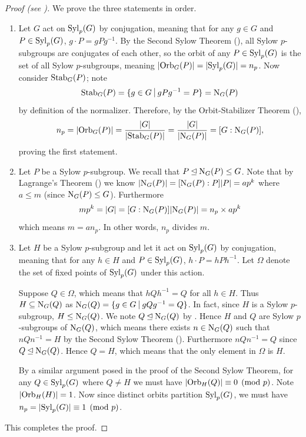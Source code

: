 \begin{proof}[Proof (see \cite{wielandt_1959})]
    We prove the three statements in order.
    \begin{enumerate}
        \item Let $G$ act on $\mathrm{Syl}_{p}(G)$ by conjugation, meaning that for any $g \in G$ and $P \in \mathrm{Syl}_{p}(G)$, $g\cdot P = gPg^{-1}$. By the Second Sylow Theorem (), all Sylow $p$-subgroups are conjugates of each other, so the orbit of any $P \in \mathrm{Syl}_{p}(G)$ is the set of all Sylow $p$-subgroups, meaning $|\mathrm{Orb}_{G}(P)| = |\mathrm{Syl}_{p}(G)| = n_p$. Now consider $\mathrm{Stab}_{G}(P)$; note
        \[
            \Stab{G}{P} = \{g \in G \vert gPg^{-1} = P\} = \N{G}{P}
        \]
        by definition of the normalizer. Therefore, by the Orbit-Stabilizer Theorem (),
        \[
            n_p = |\mathrm{Orb}_{G}(P)| = \frac{|G|}{|\mathrm{Stab}_{G}(P)|} = \frac{|G|}{|\mathrm{N}_{G}(P)|} = [G : \mathrm{N}_{G}(P)],
        \]
        proving the first statement.

        \item Let $P$ be a Sylow $p$-subgroup. We recall that $P \unlhd \mathrm{N}_{G}(P) \leq G$. Note that by Lagrange's Theorem () we know $|\mathrm{N}_{G}(P)| = [\mathrm{N}_{G}(P) : P]|P| = ap^k$ where $a \leq m$ (since $\mathrm{N}_{G}(P) \leq G$). Furthermore
        \[
            mp^k = |G| = [G: \mathrm{N}_{G}(P)]|\mathrm{N}_{G}(P)| = n_p \times ap^k
        \]
        which means $m = an_p$. In other words, $n_p$ divides $m$.

        \item Let $H$ be a Sylow $p$-subgroup and let it act on $\mathrm{Syl}_{p}(G)$ by conjugation, meaning that for any $h \in H$ and $P \in \mathrm{Syl}_{p}(G)$, $h \cdot P = hPh^{-1}$. Let $\Omega$ denote the set of fixed points of $\mathrm{Syl}_{p}(G)$ under this action.

        Suppose $Q \in \Omega$, which means that $hQh^{-1} = Q$ for all $h \in H$. Thus $H \subseteq \mathrm{N}_{G}(Q)$ as $\N{G}{Q} = \{g \in G \vert gQg^{-1} = Q\}$. In fact, since $H$ is a Sylow $p$-subgroup, $H \leq \mathrm{N}_{G}(Q)$. We note $Q \unlhd \mathrm{N}_{G}(Q)$ by . Hence $H$ and $Q$ are Sylow $p$-subgroups of $\mathrm{N}_{G}(Q)$, which means there exists $n \in \mathrm{N}_{G}(Q)$ such that $nQn^{-1} = H$ by the Second Sylow Theorem (). Furthermore $nQn^{-1} = Q$ since $Q \unlhd \mathrm{N}_{G}(Q)$. Hence $Q = H$, which means that the only element in $\Omega$ is $H$.

        By a similar argument posed in the proof of the Second Sylow Theorem, for any $Q \in \mathrm{Syl}_{p}(G)$ where $Q \neq H$ we must have $|\mathrm{Orb}_{H}(Q)| \equiv 0 \pmod p$. Note $|\mathrm{Orb}_{H}(H)| = 1$. Now since distinct orbits partition $\mathrm{Syl}_{p}(G)$, we must have $n_p = |\mathrm{Syl}_{p}(G)| \equiv 1 \pmod p$.
    \end{enumerate}
    This completes the proof.
\end{proof}

